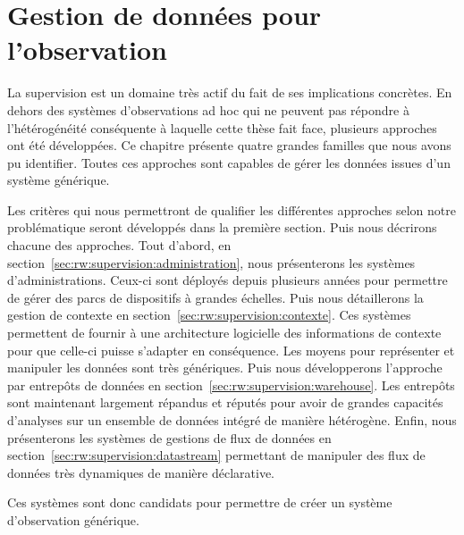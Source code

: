 \chapter{Gestion de données pour l'observation}
\minitoc

La supervision est un domaine très actif du fait de ses implications concrètes. En dehors des systèmes d'observations ad hoc qui ne peuvent pas répondre à l'hétérogénéité conséquente à laquelle cette thèse fait face, plusieurs approches ont été développées. Ce chapitre présente quatre grandes familles que nous avons pu identifier. Toutes ces approches sont capables de gérer les données issues d'un système générique.

Les critères qui nous permettront de qualifier les différentes approches selon notre problématique seront développés dans la première section. Puis nous décrirons chacune des approches. Tout d'abord, en section~\ref{sec:rw:supervision:administration}, nous présenterons les systèmes d'administrations. Ceux-ci sont déployés depuis plusieurs années pour permettre de gérer des parcs de dispositifs à grandes échelles. Puis nous détaillerons la gestion de contexte en section~\ref{sec:rw:supervision:contexte}. Ces systèmes permettent de fournir à une architecture logicielle des informations de contexte pour que celle-ci puisse s'adapter en conséquence. Les moyens pour représenter et manipuler les données sont très génériques. Puis nous développerons l'approche par entrepôts de données en section~\ref{sec:rw:supervision:warehouse}. Les entrepôts sont maintenant largement répandus et réputés pour avoir de grandes capacités d'analyses sur un ensemble de données intégré de manière hétérogène. Enfin, nous présenterons les systèmes de gestions de flux de données en section~\ref{sec:rw:supervision:datastream} permettant de manipuler des flux de données très dynamiques de manière déclarative.

Ces systèmes sont donc candidats pour permettre de créer un système d'observation générique.







